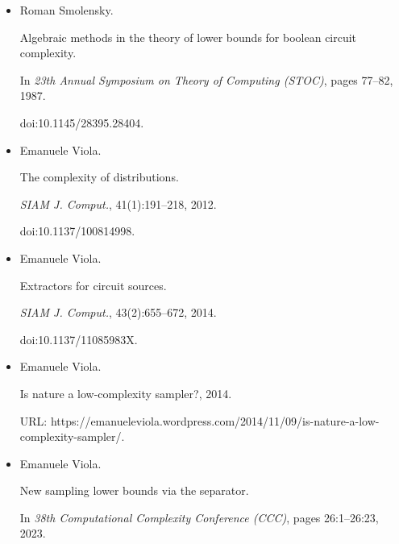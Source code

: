\documentclass[10pt,a4paper]{article}
\begin{document}
\begin{itemize}
C. E. Shannon.


A mathematical theory of communication.


\emph{Bell System Tech. J.}, 27:379–423, 623–656, 1948.


doi:10.1002/j.1538-7305.1948.tb01338.x.





\item[] 
[41]

Roman Smolensky.


Algebraic methods in the theory of lower bounds for boolean circuit
complexity.


In \emph{23th Annual Symposium on Theory of Computing (STOC)}, pages
77–82, 1987.


doi:10.1145/28395.28404.





\item[] 
[42]

Emanuele Viola.


The complexity of distributions.


\emph{SIAM J. Comput.}, 41(1):191–218, 2012.


doi:10.1137/100814998.





\item[] 
[43]

Emanuele Viola.


Extractors for circuit sources.


\emph{SIAM J. Comput.}, 43(2):655–672, 2014.


doi:10.1137/11085983X.





\item[] 
[44]

Emanuele Viola.


Is nature a low-complexity sampler?, 2014.


URL:
https://emanueleviola.wordpress.com/2014/11/09/is-nature-a-low-complexity-sampler/.





\item[] 
[45]

Emanuele Viola.


New sampling lower bounds via the separator.


In \emph{38th Computational Complexity Conference (CCC)}, pages
26:1–26:23, 2023.



\end{itemize}
\end{document}
